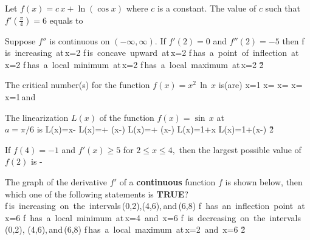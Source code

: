 \documentclass[amsfonts,bezier,leqno,fleqn,12pt,a4paper]{article}
\begin{document}
{{\begin{large}
\item %
Let $f(x)=c\,x+\ln(\cos x)$ where $c$ is a constant. The value of $c$ such that $f'(\displaystyle \frac{\pi}{4})=6$ equals to
\sc
{}
\ee
{}
\ee
{}
\ee
{}
\ee
{}
\ee

\newpage



\item %
Suppose $f''$ is continuous on $(-\infty,\infty).$ If $f'(2)=0$ and $f''(2)=-5$ then
\sc
\be
f\,\mbox{is increasing at}\,x=2
\ee
\be
f\,\mbox{is concave upward at}\,x=2
\ee
\be
f\,\mbox{has a point of inflection at}\,x=2
\ee
\be
f\,\mbox{has a local minimum at}\,x=2
\ee
\be
f\,\mbox{has a local maximum at}\,x=2
\ee
\v2



\item %
The critical number(s) for the function $\displaystyle f(x)=x^2\,\ln\,x$ is(are)
\sc
\be
x=1
\ee
\be
\displaystyle x=
\ee
\be
\displaystyle x=
\ee
\be
\displaystyle x=\displaystyle{}
\ee
\be
\displaystyle x=1\,\mbox{and}\,
\ee

\newpage



\item %
The linearization  $L(x)$ of the function $f(x)=\sin\,x$ at \\$a=\pi/6$ is
\sc
\be
\displaystyle L(x)=x-
\ee
\be
\displaystyle L(x)=+ \left(x-\right)
\ee
\be
\displaystyle L(x)=+ \left(x-\right)
\ee
\be
\displaystyle L(x)=1+x
\ee
\be
\displaystyle L(x)=1+\left(x-\right)
\ee
\v2



\item %
If $f(4)=-1$ and $f'(x)\geq 5$ for $2\leq x \leq 4,$ then the largest possible value of $f(2)$ is
\sc
{}
\ee
{}
\ee
{}
\ee
\be
\displaystyle -
\ee
{}
\ee

\newpage



\item %
The graph of the derivative $f'$ of a \textbf{continuous} function $f$ is shown below, then which one of the following statements is \textbf{TRUE}?\\[0.5in]
\sc
\be
f\,\mbox{is increasing on the intervals}\,(0,2),(4,6),\,\mbox{and}\,(6,8)
\ee
\be
f\, \mbox{has an inflection point at}\,x=6
\ee
\be
f\, \mbox{has a local minimum at}\,x=4 \,\mbox{and}\, x=6
\ee
\be
f\, \mbox{is decreasing on the intervals}\, (0,2), (4,6),\,\mbox{and}\,(6,8)
\ee
\be
f\,\mbox{has a local maximum at}\,x=2 \,\mbox{and}\, x=6
\ee
\v2




\end{large}}}
\end{document}
